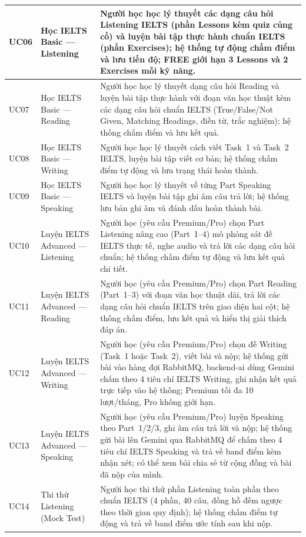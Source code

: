 \begin{longtable}{|p{15\tbu}|p{45\tbu}|p{90\tbu}|}
    UC06 & Học IELTS Basic --- Listening & Người học học lý thuyết các dạng câu hỏi Listening IELTS (phần Lessons kèm quiz củng cố) và luyện bài tập thực hành chuẩn IELTS (phần Exercises); hệ thống tự động chấm điểm và lưu tiến độ; FREE giới hạn 3 Lessons và 2 Exercises mỗi kỹ năng. \\ \hline
    UC07 & Học IELTS Basic --- Reading & Người học học lý thuyết dạng câu hỏi Reading và luyện bài tập thực hành với đoạn văn học thuật kèm các dạng câu hỏi chuẩn IELTS (True/False/Not Given, Matching Headings, điền từ, trắc nghiệm); hệ thống chấm điểm và lưu kết quả. \\ \hline
    UC08 & Học IELTS Basic --- Writing & Người học học lý thuyết cách viết Task~1 và Task~2 IELTS, luyện bài tập viết cơ bản; hệ thống chấm điểm tự động và lưu trạng thái hoàn thành. \\ \hline
    UC09 & Học IELTS Basic --- Speaking & Người học học lý thuyết về từng Part Speaking IELTS và luyện bài tập ghi âm câu trả lời; hệ thống lưu bản ghi âm và đánh dấu hoàn thành bài. \\ \hline
    UC10 & Luyện IELTS Advanced --- Listening & Người học (yêu cầu Premium/Pro) chọn Part Listening nâng cao (Part~1--4) mô phỏng sát đề IELTS thực tế, nghe audio và trả lời các dạng câu hỏi chuẩn; hệ thống chấm điểm tự động và lưu kết quả chi tiết. \\ \hline
    UC11 & Luyện IELTS Advanced --- Reading & Người học (yêu cầu Premium/Pro) chọn Part Reading (Part~1--3) với đoạn văn học thuật dài, trả lời các dạng câu hỏi chuẩn IELTS trên giao diện hai cột; hệ thống chấm điểm, lưu kết quả và hiển thị giải thích đáp án. \\ \hline
    UC12 & Luyện IELTS Advanced --- Writing & Người học (yêu cầu Premium/Pro) chọn đề Writing (Task~1 hoặc Task~2), viết bài và nộp; hệ thống gửi bài vào hàng đợi RabbitMQ, backend-ai dùng Gemini chấm theo 4 tiêu chí IELTS Writing, ghi nhận kết quả trực tiếp vào hệ thống; Premium tối đa 10 lượt/tháng, Pro không giới hạn. \\ \hline
    UC13 & Luyện IELTS Advanced --- Speaking & Người học (yêu cầu Premium/Pro) luyện Speaking theo Part~1/2/3, ghi âm câu trả lời và nộp; hệ thống gửi bài lên Gemini qua RabbitMQ để chấm theo 4 tiêu chí IELTS Speaking và trả về band điểm kèm nhận xét; có thể xem bài chia sẻ từ cộng đồng và bài đã nộp của mình. \\ \hline
    UC14 & Thi thử Listening (Mock Test) & Người học thi thử phần Listening toàn phần theo chuẩn IELTS (4 phần, 40 câu, đồng hồ đếm ngược theo thời gian quy định); hệ thống chấm điểm tự động và trả về band điểm ước tính sau khi nộp. \\ \hline

\end{longtable}
